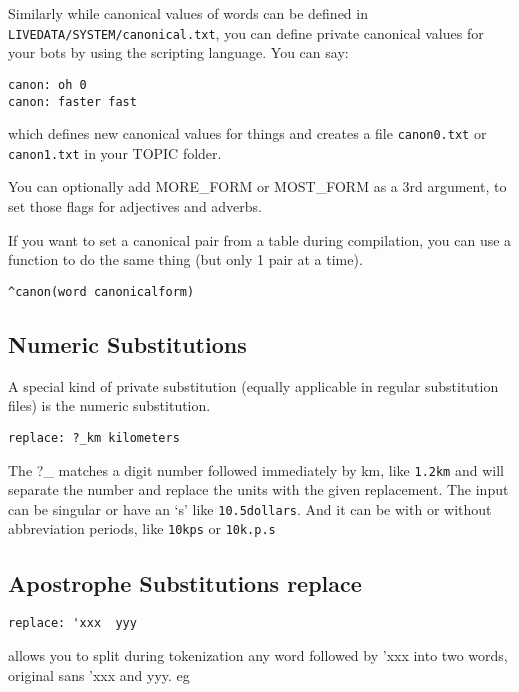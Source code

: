 \documentclass[]{article}
\begin{document}
Similarly while canonical values of words can be defined in
\texttt{LIVEDATA/SYSTEM/canonical.txt}, you can define private canonical
values for your bots by using the scripting language. You can say:

\begin{verbatim}
canon: oh 0 
canon: faster fast
\end{verbatim}

which defines new canonical values for things and creates a file
\texttt{canon0.txt} or \texttt{canon1.txt} in your TOPIC folder.

You can optionally add MORE\_FORM or MOST\_FORM as a 3rd argument, to
set those flags for adjectives and adverbs.

If you want to set a canonical pair from a table during compilation, you
can use a function to do the same thing (but only 1 pair at a time).

\begin{verbatim}
^canon(word canonicalform)
\end{verbatim}

\subsection{Numeric Substitutions}\label{numeric-substitutions}

A special kind of private substitution (equally applicable in regular
substitution files) is the numeric substitution.

\begin{verbatim}
replace: ?_km kilometers
\end{verbatim}

The ?\_ matches a digit number followed immediately by km, like
\texttt{1.2km} and will separate the number and replace the units with
the given replacement. The input can be singular or have an `s' like
\texttt{10.5dollars}. And it can be with or without abbreviation
periods, like \texttt{10kps} or \texttt{10k.p.s}

\subsection{Apostrophe Substitutions
replace}\label{apostrophe-substitutions-replace}

\begin{verbatim}
replace: 'xxx  yyy
\end{verbatim}

allows you to split during tokenization any word followed by 'xxx into
two words, original sans 'xxx and yyy. eg
\end{document}
